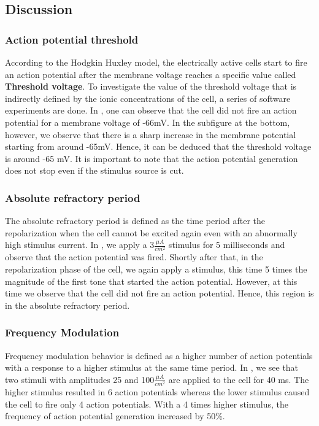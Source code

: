 \documentclass{IEEEtran}
\begin{document}
\subsection{Discussion}
\subsubsection{Action potential threshold}
According to the Hodgkin Huxley model, the electrically active cells start to fire an action potential after the membrane voltage reaches a specific value called \textbf{Threshold voltage}. To investigate the value of the threshold voltage that is indirectly defined by the ionic concentrations of the cell, a series of software experiments are done. In , one can observe that the cell did not fire an action potential for a membrane voltage of -66mV. In the subfigure at the bottom, however, we observe that there is a sharp increase in the membrane potential starting from around -65mV. Hence, it can be deduced that the threshold voltage is around -65 mV. It is important to note that the action potential generation does not stop even if the stimulus source is cut. 
\subsubsection{Absolute refractory period}
The absolute refractory period is defined as the time period after the repolarization when the cell cannot be excited again even with an abnormally high stimulus current. In , we apply a 3$\frac{\mu A}{cm^2}$ stimulus for 5 milliseconds and observe that the action potential was fired. Shortly after that, in the repolarization phase of the cell, we again apply a stimulus, this time 5 times the magnitude of the first tone that started the action potential. However, at this time we observe that the cell did not fire an action potential. Hence, this region is in the absolute refractory period.
\subsubsection{Frequency Modulation}
Frequency modulation behavior is defined as a higher number of action potentials with a response to a higher stimulus at the same time period. In , we see that two stimuli with amplitudes 25 and 100$\frac{\mu A}{cm^2}$ are applied to the cell for 40 ms. The higher stimulus resulted in 6 action potentials whereas the lower stimulus caused the cell to fire only 4 action potentials. With a 4 times higher stimulus, the frequency of action potential generation increased by 50\%. 
\end{document}
